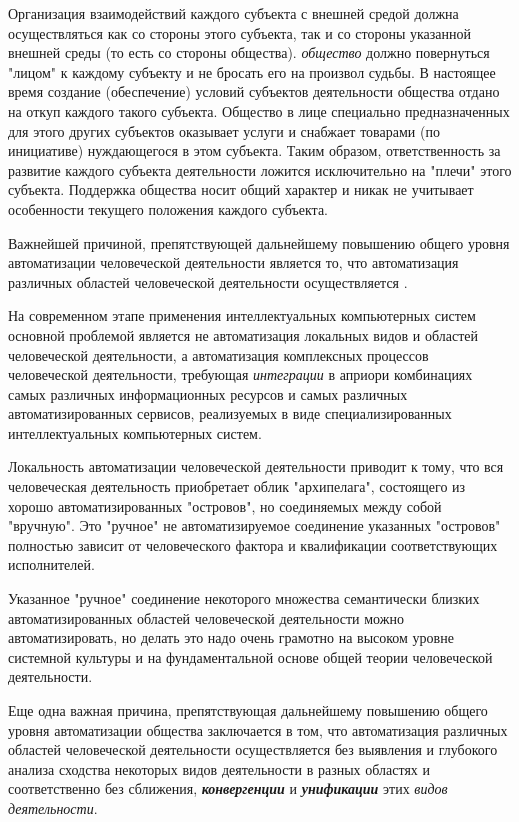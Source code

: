 Организация взаимодействий каждого субъекта с внешней средой должна осуществляться как со стороны этого субъекта, так и со стороны указанной внешней среды (то есть со стороны общества). \textit{общество} должно повернуться "лицом"{} к каждому субъекту и не бросать его на произвол судьбы. В настоящее время создание (обеспечение) условий субъектов деятельности общества отдано на откуп каждого такого субъекта. Общество в лице специально предназначенных для этого других субъектов оказывает услуги и снабжает товарами  (по инициативе) нуждающегося в этом субъекта. Таким образом, ответственность за развитие каждого субъекта деятельности ложится исключительно на "плечи"{} этого субъекта. Поддержка общества носит общий характер и никак не учитывает особенности текущего положения каждого субъекта.

Важнейшей причиной, препятствующей дальнейшему повышению общего уровня автоматизации человеческой деятельности является то, что автоматизация различных областей человеческой деятельности осуществляется .

На современном этапе применения интеллектуальных компьютерных систем основной проблемой является не автоматизация локальных видов и областей человеческой деятельности, а автоматизация комплексных процессов человеческой деятельности, требующая \textit{интеграции} в априори  комбинациях самых различных информационных ресурсов и самых различных автоматизированных сервисов, реализуемых в виде специализированных интеллектуальных компьютерных систем.

Локальность автоматизации человеческой деятельности приводит к тому, что вся человеческая деятельность приобретает облик "архипелага"{}, состоящего из хорошо автоматизированных "островов"{}, но соединяемых между собой "вручную"{}. Это "ручное"{} не автоматизируемое соединение указанных "островов"{} полностью зависит от человеческого фактора и квалификации соответствующих исполнителей.

Указанное "ручное"{} соединение некоторого множества семантически близких автоматизированных областей человеческой деятельности можно автоматизировать, но делать это надо очень грамотно на высоком уровне системной культуры и на фундаментальной основе общей теории человеческой деятельности.

Еще одна важная причина, препятствующая дальнейшему повышению общего уровня автоматизации общества заключается в том, что автоматизация различных областей человеческой деятельности осуществляется без выявления и глубокого анализа сходства некоторых видов деятельности в разных областях и соответственно без сближения, \textbf{\textit{конвергенции}} и \textbf{\textit{унификации}} этих \textit{видов деятельности}.

